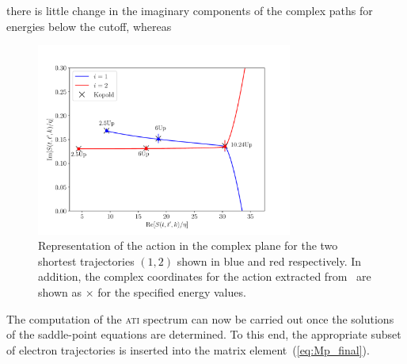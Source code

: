 there is little change in the
imaginary components of the complex paths for energies below the cutoff, whereas 


\begin{figure}
  \centering \includegraphics[width =
    0.75\textwidth]{figures/ch_ATI_SPA/rescattering/phase_ComplexReIm.pdf}
  \caption{Representation of the action in the complex plane for the
    two shortest trajectories $(1, 2)$ shown in blue and red
    respectively. In addition, the complex coordinates for the action
    extracted from~\cite{phd_Kopold} are shown as $\times$ for the
    specified energy values.}
  \label{fig:phase_ReIm}
\end{figure}


The computation of the \textsc{ati} spectrum can now be carried out
once the solutions of the saddle-point equations are determined. To
this end, the appropriate subset of electron trajectories is inserted
into the matrix element~(\ref{eq:Mp_final}).









